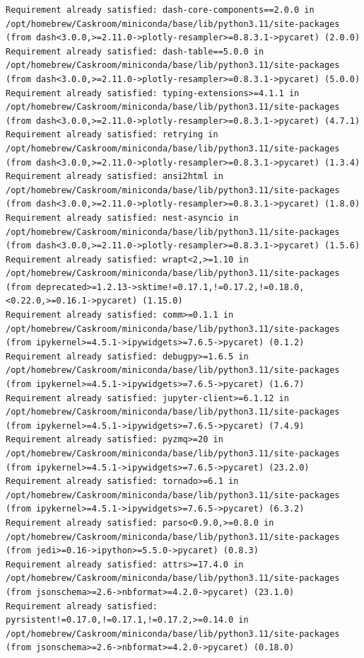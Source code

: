 \documentclass[
  letterpaper,
  DIV=11,
  numbers=noendperiod]{scrartcl}
\begin{document}
\begin{verbatim}
Requirement already satisfied: dash-core-components==2.0.0 in /opt/homebrew/Caskroom/miniconda/base/lib/python3.11/site-packages (from dash<3.0.0,>=2.11.0->plotly-resampler>=0.8.3.1->pycaret) (2.0.0)
Requirement already satisfied: dash-table==5.0.0 in /opt/homebrew/Caskroom/miniconda/base/lib/python3.11/site-packages (from dash<3.0.0,>=2.11.0->plotly-resampler>=0.8.3.1->pycaret) (5.0.0)
Requirement already satisfied: typing-extensions>=4.1.1 in /opt/homebrew/Caskroom/miniconda/base/lib/python3.11/site-packages (from dash<3.0.0,>=2.11.0->plotly-resampler>=0.8.3.1->pycaret) (4.7.1)
Requirement already satisfied: retrying in /opt/homebrew/Caskroom/miniconda/base/lib/python3.11/site-packages (from dash<3.0.0,>=2.11.0->plotly-resampler>=0.8.3.1->pycaret) (1.3.4)
Requirement already satisfied: ansi2html in /opt/homebrew/Caskroom/miniconda/base/lib/python3.11/site-packages (from dash<3.0.0,>=2.11.0->plotly-resampler>=0.8.3.1->pycaret) (1.8.0)
Requirement already satisfied: nest-asyncio in /opt/homebrew/Caskroom/miniconda/base/lib/python3.11/site-packages (from dash<3.0.0,>=2.11.0->plotly-resampler>=0.8.3.1->pycaret) (1.5.6)
Requirement already satisfied: wrapt<2,>=1.10 in /opt/homebrew/Caskroom/miniconda/base/lib/python3.11/site-packages (from deprecated>=1.2.13->sktime!=0.17.1,!=0.17.2,!=0.18.0,<0.22.0,>=0.16.1->pycaret) (1.15.0)
Requirement already satisfied: comm>=0.1.1 in /opt/homebrew/Caskroom/miniconda/base/lib/python3.11/site-packages (from ipykernel>=4.5.1->ipywidgets>=7.6.5->pycaret) (0.1.2)
Requirement already satisfied: debugpy>=1.6.5 in /opt/homebrew/Caskroom/miniconda/base/lib/python3.11/site-packages (from ipykernel>=4.5.1->ipywidgets>=7.6.5->pycaret) (1.6.7)
Requirement already satisfied: jupyter-client>=6.1.12 in /opt/homebrew/Caskroom/miniconda/base/lib/python3.11/site-packages (from ipykernel>=4.5.1->ipywidgets>=7.6.5->pycaret) (7.4.9)
Requirement already satisfied: pyzmq>=20 in /opt/homebrew/Caskroom/miniconda/base/lib/python3.11/site-packages (from ipykernel>=4.5.1->ipywidgets>=7.6.5->pycaret) (23.2.0)
Requirement already satisfied: tornado>=6.1 in /opt/homebrew/Caskroom/miniconda/base/lib/python3.11/site-packages (from ipykernel>=4.5.1->ipywidgets>=7.6.5->pycaret) (6.3.2)
Requirement already satisfied: parso<0.9.0,>=0.8.0 in /opt/homebrew/Caskroom/miniconda/base/lib/python3.11/site-packages (from jedi>=0.16->ipython>=5.5.0->pycaret) (0.8.3)
Requirement already satisfied: attrs>=17.4.0 in /opt/homebrew/Caskroom/miniconda/base/lib/python3.11/site-packages (from jsonschema>=2.6->nbformat>=4.2.0->pycaret) (23.1.0)
Requirement already satisfied: pyrsistent!=0.17.0,!=0.17.1,!=0.17.2,>=0.14.0 in /opt/homebrew/Caskroom/miniconda/base/lib/python3.11/site-packages (from jsonschema>=2.6->nbformat>=4.2.0->pycaret) (0.18.0)

\end{verbatim}
\end{document}
